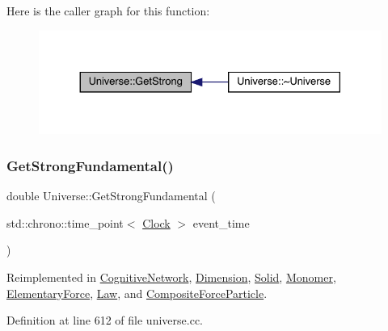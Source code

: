 Here is the caller graph for this function\+:
\nopagebreak
\begin{figure}[H]
\begin{center}
\leavevmode
\includegraphics[width=330pt]{class_universe_acb453ce71da418c5b5617fecede9571b_icgraph}
\end{center}
\end{figure}
\mbox{\label{class_universe_ab44daccba01ee7e3cf9b50bba83dd19e}} 
\subsubsection{\texorpdfstring{Get\+Strong\+Fundamental()}{GetStrongFundamental()}}
{\footnotesize\ttfamily double Universe\+::\+Get\+Strong\+Fundamental (\begin{DoxyParamCaption}\item[{std\+::chrono\+::time\+\_\+point$<$ \hyperlink{universe_8h_a0ef8d951d1ca5ab3cfaf7ab4c7a6fd80}{Clock} $>$}]{event\+\_\+time }\end{DoxyParamCaption})\hspace{0.3cm}{\ttfamily [virtual]}}



Reimplemented in \hyperlink{class_cognitive_network_a942ca90561fedae46136de620accbfea}{Cognitive\+Network}, \hyperlink{class_dimension_ad0d067d7f9dc4841b0ad280979ebe7af}{Dimension}, \hyperlink{class_solid_ab3a972354b25ad1bbe8c3f3e7638e24c}{Solid}, \hyperlink{class_monomer_a4bc8b39086260e26a196b28b4fc6667f}{Monomer}, \hyperlink{class_elementary_force_a0974d6537c07dac2453d2a607324fa21}{Elementary\+Force}, \hyperlink{class_law_afcdbea76524e5a52691fff7b526971e9}{Law}, and \hyperlink{class_composite_force_particle_abc8597f3b4f7cf755ab4618bd624b046}{Composite\+Force\+Particle}.



Definition at line 612 of file universe.\+cc.

